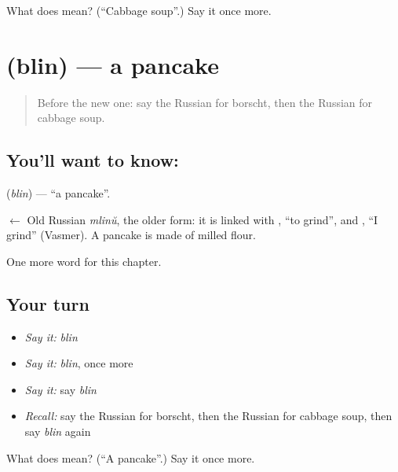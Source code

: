 \begin{tcolorbox}[breakable,colback=teal!4,colframe=teal!35!black,title={Before you move on}]
What does  mean? (\textquotedblleft{}Cabbage soup\textquotedblright{}.) Say it once more.
\end{tcolorbox}
\section[\texorpdfstring{\ru{блин} (blin)}{блин (blin)}]{ (blin) — a pancake}

\label{lesson:RU-C163-blin}



\begin{quote}
Before the new one: say the Russian for borscht, then the Russian for cabbage soup.
\end{quote}

\subsection*{You'll want to know: }
\textbf{} (\emph{blin}) — \textquotedblleft{}a pancake\textquotedblright{}.

\begin{cousinweb}
\textbf{} $\leftarrow$ Old Russian \emph{mlinŭ}, the older form: it is linked with \emph{}, \textquotedblleft{}to grind\textquotedblright{}, and \emph{}, \textquotedblleft{}I grind\textquotedblright{} (Vasmer). A pancake is made of milled flour.
\end{cousinweb}

\begin{grammarlens}[title={What you've built}]
One more word for this chapter.
\end{grammarlens}

\subsection*{Your turn}
\begin{itemize}
\raggedright
  \item \emph{Say it:} \emph{blin}
  \item \emph{Say it:} \emph{blin}, once more
  \item \emph{Say it:} say \emph{blin}
  \item \emph{Recall:} say the Russian for borscht, then the Russian for cabbage soup, then say \emph{blin} again
\end{itemize}

\begin{tcolorbox}[breakable,colback=teal!4,colframe=teal!35!black,title={Before you move on}]
What does  mean? (\textquotedblleft{}A pancake\textquotedblright{}.) Say it once more.
\end{tcolorbox}
